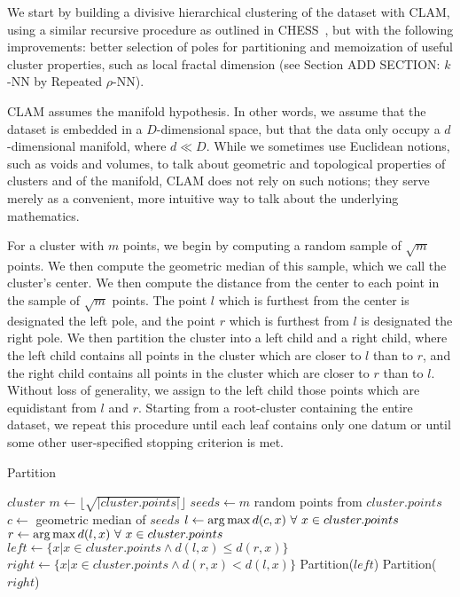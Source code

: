 We start by building a divisive hierarchical clustering of the dataset with CLAM, using a 
similar recursive procedure as outlined in CHESS~\cite{ishaq2019clustered}, but with the following 
improvements: better selection of poles for partitioning and memoization of useful cluster properties, 
such as local fractal dimension (see Section ADD SECTION: $k$-NN by Repeated $\rho$-NN). 


CLAM assumes the manifold hypothesis. 
In other words, we assume that the dataset is embedded in a $D$-dimensional space, but that the data only occupy 
a $d$-dimensional manifold, where $d \ll D$. 
While we sometimes use Euclidean notions, such as voids and volumes, to talk about geometric and topological 
properties of clusters and of the manifold, CLAM does not rely on such notions; 
they serve merely as a convenient, more intuitive way to talk about the underlying mathematics.


For a cluster with $m$ points, we begin by computing a 
random sample of $\sqrt m$ points. We then compute the geometric median of this sample, which we call the 
cluster's center. We then compute the distance from the center to each point in the sample of $\sqrt m$ points. 
The point $l$ which is furthest from the center is designated the left pole, and the point $r$ which is furthest
from $l$ is designated the right pole. We then partition the cluster into a left child and a right child, where the 
left child contains all points in the cluster which are closer to $l$ than to $r$, and the right child contains all 
points in the cluster which are closer to $r$ than to $l$. Without loss of generality, we assign to the left child 
those points which are equidistant from $l$ and $r$. Starting from a root-cluster containing the entire dataset, we 
repeat this procedure until each leaf contains only one datum or until some other user-specified stopping criterion 
is met.


\begin{algorithm} %
\caption{Partition} %
\label{alg:partition} %
\begin{algorithmic}[1] %
    \REQUIRE $cluster$
    \STATE $m \leftarrow \lfloor \sqrt{|cluster.points|} \rfloor$
    \STATE $seeds \leftarrow m$ random points from $cluster.points$
    \STATE $c \leftarrow$ geometric median of $seeds$
    \STATE $l \leftarrow \operatorname*{arg\,max} d(c,x) \ \forall \ x \in cluster.points$
    \STATE $r \leftarrow \operatorname*{arg\,max} d(l,x) \ \forall \ x \in cluster.points$
    \STATE $left \leftarrow \{x | x \in cluster.points \land d(l,x) \le d(r,x)\}$
    \STATE $right \leftarrow \{x | x \in cluster.points \land d(r,x) < d(l,x)\}$
        \STATE Partition($left$)
    \ENDIF
        \STATE Partition($right$)
    \ENDIF
\end{algorithmic}
\end{algorithm}

